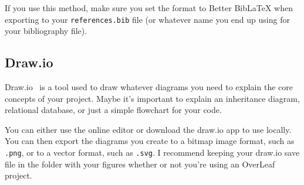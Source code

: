 If you use this method, make sure you set the format to Better BibLaTeX when exporting to your
\verb|references.bib| file (or whatever name you end up using for your bibliography file).

\subsection{Draw.io}

Draw.io~\cite{Drawio} is a tool used to draw whatever diagrams you need to explain the core
concepts of your project. Maybe it's important to explain an inheritance diagram, relational
database, or just a simple flowchart for your code.

You can either use the online editor or download the draw.io app to use locally. You can then
export the diagrams you create to a bitmap image format, such as \verb|.png|, or to a vector
format, such as \verb|.svg|. I recommend keeping your draw.io save file in the folder with your
figures whether or not you're using an OverLeaf project.